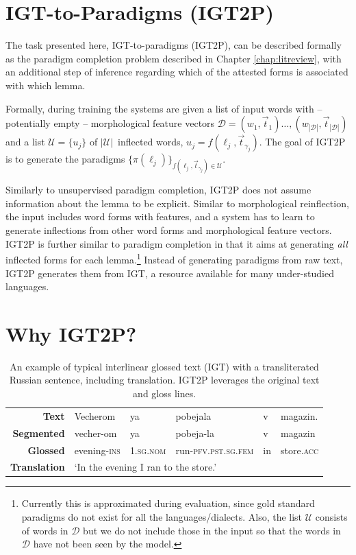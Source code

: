 \section{IGT-to-Paradigms (IGT2P)}

The task presented here, IGT-to-paradigms (IGT2P), can be described formally as the paradigm completion problem described in Chapter \ref{chap:litreview}, with an additional step of inference regarding which of the attested forms is associated with which lemma. 

Formally, during training the systems are given a list of input words with -- potentially empty -- morphological feature vectors $\mathcal{D}=(w_1,\vec{t}_1) \dots, (w_{|\mathcal{D}|}, \vec{t}_{|\mathcal{D}|})$ and a list $\mathcal{U} = \{u_j\}$ of $|\mathcal{U}|$~inflected words, $u_j = f(\ell_j, \vec{t}_{\gamma_j})$. The goal of IGT2P is to generate the paradigms 
$\{\pi(\ell_j)\}_{f(\ell_j, \vec{t}_{\gamma_j})\in\mathcal{U}}$.

Similarly to unsupervised paradigm completion, IGT2P does not assume information about the lemma to be explicit. Similar to morphological reinflection, the input includes word forms with features, and a system has to learn to generate inflections from other word forms and morphological feature vectors. 
IGT2P is further similar to paradigm completion in that it aims at generating \textit{all} inflected forms for each lemma.\footnote{Currently this is approximated during evaluation, since gold standard paradigms do not exist for all the languages/dialects. Also, the list $\mathcal{U}$ consists of words in $\mathcal{D}$ but we do not include those in the input so that the words in $\mathcal{D}$ have not been seen by the model.} Instead of generating paradigms from raw text, IGT2P generates them from IGT, a resource available for many under-studied languages.


\section{Why IGT2P?}

\begin{table}[tb]
    \centering
    \begin{tabular}{rlllll}
       \textbf{Text}  & Vecherom & ya & pobejala & v & magazin. \\
      \textbf{Segmented}   & vecher-om & ya & pobeja-la & v & magazin \\
      \textbf{Glossed} & evening-\textsc{ins} & \textsc{1.sg.nom} & run-\textsc{pfv.pst.sg.fem} & in & store.\textsc{acc} \\
      \textbf{Translation} & \multicolumn{5}{l}{`In the evening I ran to the store.'}
    \end{tabular}
    \caption[IGT example]{An example of typical interlinear glossed text (IGT) with a transliterated Russian sentence, including translation. IGT2P leverages the original text and gloss lines.}
    \label{tab:IGT}
\end{table}



